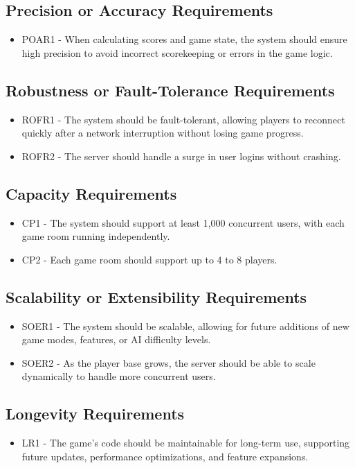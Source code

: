 \documentclass{article}
\begin{document}
\subsection{Precision or Accuracy Requirements}
\begin{itemize}
    \item POAR1 - When calculating scores and game state, the system should ensure high precision to avoid incorrect scorekeeping or errors in the game logic.
\end{itemize}

\subsection{Robustness or Fault-Tolerance Requirements}
\begin{itemize}
    \item ROFR1 - The system should be fault-tolerant, allowing players to reconnect quickly after a network interruption without losing game progress.
    \item ROFR2 - The server should handle a surge in user logins without crashing.
\end{itemize}

\subsection{Capacity Requirements}
\begin{itemize}
    \item CP1 - The system should support at least 1,000 concurrent users, with each game room running independently.
    \item CP2 - Each game room should support up to 4 to 8 players.
\end{itemize}

\subsection{Scalability or Extensibility Requirements}
\begin{itemize}
    \item SOER1 - The system should be scalable, allowing for future additions of new game modes, features, or AI difficulty levels.
    \item SOER2 - As the player base grows, the server should be able to scale dynamically to handle more concurrent users.
\end{itemize}

\subsection{Longevity Requirements}
\begin{itemize}
    \item LR1 - The game’s code should be maintainable for long-term use, supporting future updates, performance optimizations, and feature expansions.
\end{itemize}
\end{document}
